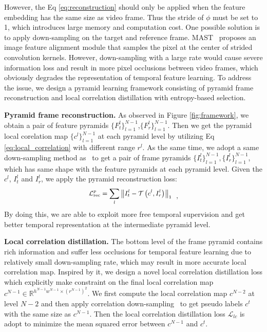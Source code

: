 \documentclass{article}
\begin{document}
However, the Eq \ref{eq:reconstruction} should only be applied when the feature embedding has the same size as video frame. Thus the stride of $\phi$ must be set to 1, which introduces large memory and computation cost. One possible solution is to apply down-sampling on the target and reference frame. MAST~\cite{lai2020mast} proposes an image feature alignment module that samples the pixel at the center of strided convolution kernels. However, down-sampling with a large rate would cause severe information loss and result in more pixel occlusions between video frames, which obviously degrades the representation of temporal feature learning. To address the issue, we design a pyramid learning framework consisting of pyramid frame reconstruction and local correlation distillation with entropy-based selection.

\textbf{Pyramid frame reconstruction.}  As observed in Figure \ref{fig:framework}, we obtain a pair of feature pyramids $\{F^l_t\}^{N-1}_{l=1}$,$\{F^l_{r}\}^{N-1}_{l=1}$.  Then we get the pyramid local corelation map $\{c^l\}^{N-1}_{l=1}$ at each pyramid level by utilizing Eq \ref{eq:local_correlation} with different range $r^l$. As the same time, we adopt a same down-sampling method as~\cite{lai2020mast} to get a pair of frame pyramids $\{I^l_t\}^{N-1}_{l=1},\{I^l_{r}\}^{N-1}_{l=1}$, which has same shape with the feature pyramids at each pyramid level. Given the $c^l$, $I^l_t$ and $I^l_r$, we apply the pyramid reconstruction loss:
\begin{equation}\label{eq:pyramid reconstruction loss}
  \small
  \begin{aligned}
    \mathcal{L}^{p}_{\mathrm{rec}}=\sum_l\left\|I^l_{t}-\mathcal{T}\left(c^l, I^l_r\right)\right\|_{1}
  \end{aligned}~~,
\end{equation}
By doing this, we are able to exploit more free temporal supervision and get better temporal representation at the intermediate pyramid level. 

\textbf{Local correlation distillation.} The bottom level of the frame pyramid contains rich information and suffer less occlusions for temporal feature learning due to relatively small down-sampling rate, which may result in more accurate local correlation map. Inspired by it, we design a novel local correlation distillation loss which explicitly make constraint on the final local correlation map $c^{N-1} \in \mathbb{R}^{h^{N-1}w^{N-1} \times (r^{N-1})^2}$. We first compute the local correlation map $c^{N-2}$ at level $N-2$ and then apply  correlation down-sampling~\cite{teed2020raft} to get pseudo labels $c^t$ with the same size as $c^{N-1}$.  Then the local correlation distillation loss $\mathcal{L}_{lc}$ is adopt to minimize the mean squared error between $c^{N-1}$ and $c^t$.\\
\end{document}
